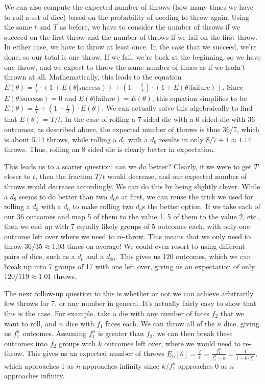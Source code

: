 \documentclass{article}
\begin{document}
\par We can also compute the expected number of throws (how many times we have to roll a set of dice) based on the probability of needing to throw again.
Using the same $t$ and $T$ as before, we have to consider the number of throws if we succeed on the first throw and the number of throws if we fail on the first throw.
In either case, we have to throw at least once. 
In the case that we succeed, we're done, so our total is one throw.
If we fail, we're back at the beginning, so we have one throw, and we expect to throw the same number of times as if we hadn't thrown at all.
Mathematically, this leads to the equation $E(\theta) = \frac{t}{T} \cdot (1 + E(\theta | \text{success})) + \left(1 -\frac{t}{T} \right) \cdot (1 + E(\theta | \text{failure}))$.
Since $E(\theta | \text{success}) = 0$ and $E(\theta | \text{failure}) = E(\theta)$, this equation simplifies to be $E(\theta) = \frac{t}{T} + \left(1 - \frac{t}{T} \right) \cdot E(\theta)$.
We can actually solve this algebraically to find that $E(\theta) = T/t$. 
In the case of rolling a 7 sided die with a 6 sided die with 36 outcomes, as described above, the expected number of throws is thus 36/7, which is about 5.14 throws, while rolling a $d_7$ with a $d_8$ results in only $8/7 + 1 \approx 1.14$ throws.
Thus, rolling an 8 sided die is clearly better in expectation.

\par This leads us to a scarier question: can we do better?
Clearly, if we were to get $T$ closer to $t$, then the fraction $T/t$ would decrease, and our expected number of throws would decrease accordingly. 
We can do this by being slightly clever.
While a $d_8$ seems to do better than two $d_6$s at first, we can reuse the trick we used for rolling a $d_3$ with a $d_6$ to make rolling two $d_6$s the better option.
If we take each of our 36 outcomes and map 5 of them to the value 1, 5 of them to the value 2, etc., then we end up with 7 equally likely groups of 5 outcomes each, with only one outcome left over where we need to re-throw.
This means that we only need to throw $36/35 \approx 1.03$ times on average! 
We could even resort to using different pairs of dice, such as a $d_6$ and a $d_{20}$.
This gives us 120 outcomes, which we can break up into 7 groups of 17 with one left over, giving us an expectation of only $120/119 \approx 1.01$ throws.

\par The next follow-up question to this is whether or not we can achieve arbitrarily few throws for 7, or any number in general. 
It's actually fairly easy to show that this is the case.
For example, take a die with any number of faces $f_2$ that we want to roll, and $n$ dice with $f_1$ faces each.
We can throw all of the $n$ dice, giving us $f_1^n$ outcomes.
Assuming $f_1^n$ is greater than $f_2$, we can then break these outcomes into $f_2$ groups with $k$ outcomes left over, where we would need to re-throw.
This gives us an expected number of throws $E_n[\theta] = \frac{T}{t} = \frac{f_1^n}{f_1^n - k} = \frac{1}{1 - k/f_1^n}$, which approaches 1 as $n$ approaches infinity since $k/f_1^n$ approaches 0 as $n$ approaches infinity.
\end{document}
